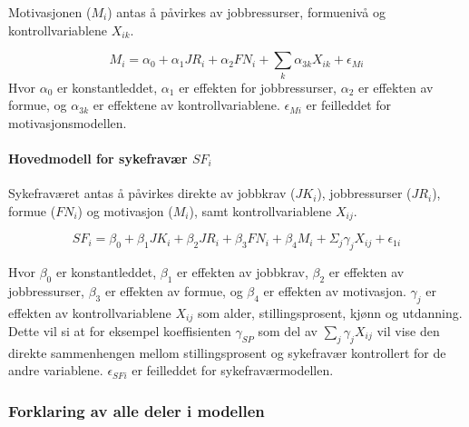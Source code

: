 \documentclass[
  12pt,
  a4paper,
  DIV=11,
  numbers=noendperiod]{scrartcl}
\let\oldparagraph\paragraph
\renewcommand{\paragraph}[1]{\oldparagraph{#1}\mbox{}}
\begin{document}
Motivasjonen (\(M_i\)) antas å påvirkes av jobbressurser, formuenivå og
kontrollvariablene \(X_{ik}\).

\[
M_i = \alpha_0 + \alpha_1 JR_i + \alpha_2 FN_i + \sum_k \alpha_{3k}X_{ik} + \epsilon_{Mi} \label{eq:motivasjon}
\] Hvor \(\alpha_0\) er konstantleddet, \(\alpha_1\) er effekten for
jobbressurser, \(\alpha_2\) er effekten av formue, og \(\alpha_{3k}\) er
effektene av kontrollvariablene. \(\epsilon_{Mi}\) er feilleddet for
motivasjonsmodellen.

\paragraph{\texorpdfstring{Hovedmodell for sykefravær
\(SF_i\)}{Hovedmodell for sykefravær SF\_i}}\label{hovedmodell-for-sykefravuxe6r-sf_i}

Sykefraværet antas å påvirkes direkte av jobbkrav (\(JK_i\)),
jobbressurser (\(JR_i\)), formue (\(FN_i\)) og motivasjon (\(M_i\)),
samt kontrollvariablene \(X_{ij}\).

\[
SF_i = \beta_0 + \beta_1 JK_i + \beta_2 JR_i + \beta_3 FN_i
        + \beta_4 M_i + \Sigma_j \gamma_{j}X_{ij} + \epsilon_{1i} \label{eq:sf_utvidet}
\]

Hvor \(\beta_0\) er konstantleddet, \(\beta_1\) er effekten av jobbkrav,
\(\beta_2\) er effekten av jobbressurser, \(\beta_3\) er effekten av
formue, og \(\beta_4\) er effekten av motivasjon. \(\gamma_{j}\) er
effekten av kontrollvariablene \(X_{ij}\) som alder, stillingsprosent,
kjønn og utdanning. Dette vil si at for eksempel koeffisienten
\(\gamma_{SP}\) som del av \(\sum_j \gamma_{j}X_{ij}\) vil vise den
direkte sammenhengen mellom stillingsprosent og sykefravær kontrollert
for de andre variablene. \(\epsilon_{SFi}\) er feilleddet for
sykefraværmodellen.

\subsubsection{Forklaring av alle deler i
modellen}\label{forklaring-av-alle-deler-i-modellen}
\end{document}
